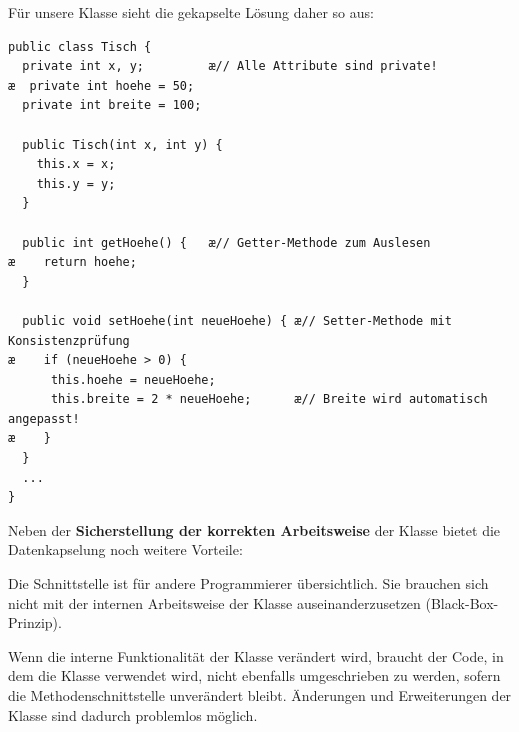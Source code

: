 Für unsere Klasse  sieht die gekapselte Lösung daher so aus:

\begin{lstlisting}
public class Tisch {
  private int x, y;         æ// Alle Attribute sind private!
æ  private int hoehe = 50;
  private int breite = 100;

  public Tisch(int x, int y) {
    this.x = x;
    this.y = y;
  }

  public int getHoehe() {   æ// Getter-Methode zum Auslesen
æ    return hoehe;
  }

  public void setHoehe(int neueHoehe) { æ// Setter-Methode mit Konsistenzprüfung
æ    if (neueHoehe > 0) {
      this.hoehe = neueHoehe;
      this.breite = 2 * neueHoehe;      æ// Breite wird automatisch angepasst!
æ    }
  }
  ...
}
\end{lstlisting}

Neben der \textbf{Sicherstellung der korrekten Arbeitsweise} der Klasse bietet
die Datenkapselung noch weitere Vorteile:

\begin{compactitem}
\item[\textbf{Benutzbarkeit:}] Die Schnittstelle ist für andere Programmierer
übersichtlich. Sie brauchen sich nicht mit der internen Arbeitsweise der Klasse
auseinanderzusetzen (Black-Box-Prinzip).
\item[\textbf{Wartbarkeit:}] Wenn die interne Funktionalität der Klasse
verändert wird, braucht der Code, in dem die Klasse verwendet wird, nicht
ebenfalls umgeschrieben zu werden, sofern die Methodenschnittstelle unverändert bleibt.
Änderungen und Erweiterungen der Klasse sind dadurch problemlos möglich.
\end{compactitem}
